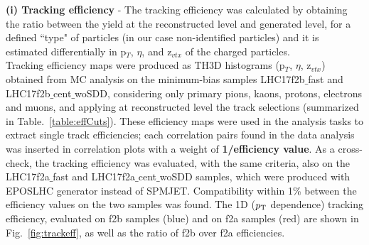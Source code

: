 {\bf \normalsize (i) Tracking efficiency} - The tracking efficiency was calculated by obtaining the ratio between the yield at the reconstructed level and generated level, for a defined ``type" of particles (in our case non-identified particles) and it is estimated differentially in p$_T$, $\eta$, and z$_{vtx}$ of the charged particles.\\

Tracking efficiency maps were produced as TH3D histograms (p$_T$, $\eta$, z$_{vtx}$) obtained from MC analysis on the minimum-bias samples LHC17f2b$\_$fast and LHC17f2b$\_$cent$\_$woSDD, considering only primary pions, kaons, protons, electrons and muons, and applying at reconstructed level the track selections (summarized in Table.~\ref{table:effCuts}). These efficiency maps were used in the analysis tasks to extract single track efficiencies; each correlation pairs found in the data analysis was inserted in correlation plots with a weight of {\bf 1/efficiency value}. 
As a cross-check, the tracking efficiency was evaluated, with the same criteria, also on the LHC17f2a$\_$fast and LHC17f2a$\_$cent$\_$woSDD samples, which were produced with EPOSLHC generator instead of SPMJET. Compatibility within 1\% between the efficiency values on the two samples was found.
The 1D ($p_{\rm T}$ dependence) tracking efficiency, evaluated on f2b samples (blue) and on f2a samples (red) are shown in Fig.~\ref{fig:trackeff}, as well as the ratio of f2b over f2a efficiencies.

